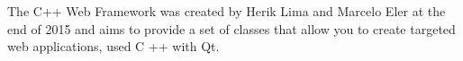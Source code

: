 The C++ Web Framework was created by Herik Lima and Marcelo Eler at the end of 2015 and aims to provide a set of classes that allow you to create targeted web applications, used C ++ with Qt. 